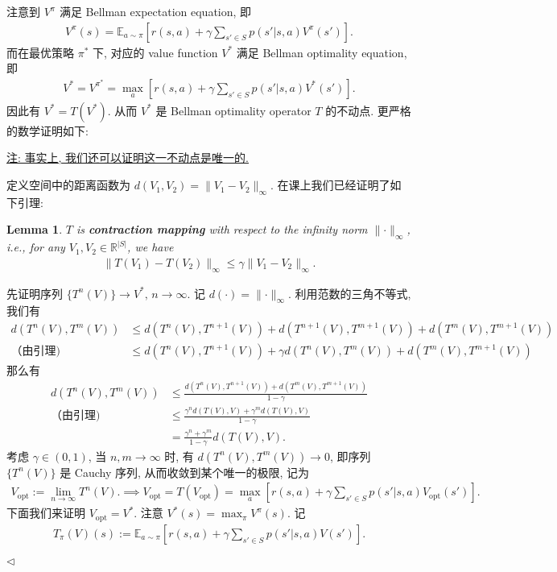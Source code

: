 \documentclass[11pt]{article}
\newtheorem{lemma}[theorem]{Lemma}
\newenvironment{answer}[1][Solution]{\begin{trivlist}
\item[\hskip \labelsep {\bfseries #1.}\hskip \labelsep]}{\hfill$\lhd$\end{trivlist}}
\newcommand\1{\mathds{1}}
\newcommand\R{\mathbb{R}}
\newcommand\E{\mathbb{E}}
\begin{document}
\begin{answer}
    注意到 $V^\pi$ 满足 Bellman expectation equation, 即
    \begin{align*}
        V^\pi(s) = \E_{a\sim \pi}\left[r(s, a) + \gamma \sum_{s'\in S} p(s'|s, a) V^\pi(s')\right].
    \end{align*}
    而在最优策略 $\pi^*$ 下, 对应的 value function $V^*$ 满足 Bellman optimality equation, 即
    \begin{align*}
        V^* = V^{\pi^*} = \max_{a}\left[r(s, a) + \gamma \sum_{s'\in S} p(s'|s, a) V^{*}(s')\right].
    \end{align*}
    因此有 $V^* = T(V^*)$. 从而 $V^*$ 是 Bellman optimality operator $T$ 的不动点. 更严格的数学证明如下:
    
    \underline{注: 事实上, 我们还可以证明这一不动点是唯一的.}
    
    定义空间中的距离函数为 $d(V_1, V_2) = \lVert V_1 -  V_2 \rVert_\infty$. 在课上我们已经证明了如下引理:
    
    \begin{lemma}
        $T$ is \textbf{contraction mapping} with respect to the infinity norm $\lVert \cdot \rVert_\infty$, i.e., for any $V_1, V_2 \in \R^{|S|}$, we have
        \begin{align*}
            \lVert T(V_1) - T(V_2) \rVert_\infty \leq \gamma \lVert V_1 - V_2 \rVert_\infty.
        \end{align*}
    \end{lemma}
    先证明序列 $\{T^n(V)\} \to V^*, \, n\to \infty$. 记 $d(\cdot) = \lVert \cdot \rVert_\infty$. 利用范数的三角不等式, 我们有
    \begin{align*}
        d(T^n(V), T^m(V)) &\le d(T^{n}(V), T^{n+1}(V)) + d(T^{n+1}(V), T^{m+1}(V)) + d(T^m(V), T^{m+1}(V)) \\
        \text{（由引理) }&\le d(T^{n}(V), T^{n+1}(V)) + \gamma d(T^{n}(V), T^{m}(V)) + d(T^m(V), T^{m+1}(V))
    \end{align*}
    那么有
    \begin{align*}
        d(T^n(V), T^{m}(V)) &\le \frac{d(T^{n}(V), T^{n+1}(V)) + d(T^m(V), T^{m+1}(V))}{ 1 - \gamma} \\
        \text{（由引理) }&\le \frac{\gamma^n d(T(V), V) + \gamma^m d(T(V), V)}{1-\gamma} \\
        &= \frac{\gamma^n + \gamma^m}{1-\gamma} d(T(V), V).
    \end{align*}
    考虑 $\gamma\in (0,1)$, 当 $n, m \to \infty$ 时, 有 $d(T^n(V), T^m(V)) \to 0$, 即序列 $\{T^n(V)\}$ 是 Cauchy 序列, 从而收敛到某个唯一的极限, 记为
    \begin{align*}
        V_\text{opt} := \lim_{n\to \infty} T^n(V). \implies V_\text{opt} = T(V_\text{opt}) = \max_a \left[r(s, a) + \gamma \sum_{s'\in S} p(s'|s, a) V_\text{opt}(s')\right].
    \end{align*}
    下面我们来证明 $V_\text{opt} = V^*$. 注意 $V^*(s) =  \max_\pi V^\pi(s)$. 记
    \begin{align*}
        T_\pi(V)(s) := \E_{a\sim \pi} \left[r(s, a) + \gamma \sum_{s'\in S} p(s'|s, a) V(s')\right].
    \end{align*}
    

\end{answer}
\end{document}
